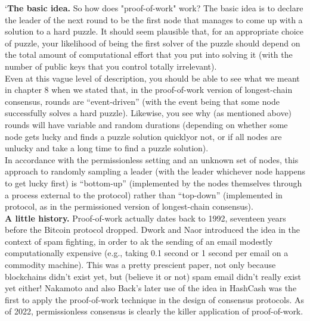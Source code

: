 `\textbf{The basic idea.} So how does "proof-of-work" work? The basic idea is to declare the
leader of the next round to be the first node that manages to come up with a solution to a
hard puzzle. It should seem plausible that, for an appropriate choice of puzzle, your likelihood
of being the first solver of the puzzle should depend on the total amount of computational
effort that you put into solving it (with the number of public keys that you control totally
irrelevant).\\
Even at this vague level of description, you should be able to see what we meant in chapter 8 when we stated that, in the proof-of-work version of longest-chain consensus, rounds are
“event-driven” (with the event being that some node successfully solves a hard puzzle). Likewise, you see why (as mentioned above) rounds will have variable and random durations (depending on whether some node gets lucky and finds a puzzle solution quicklyor not, or if all
nodes are unlucky and take a long time to find a puzzle solution).\\
In accordance with the permissionless setting and an unknown set of nodes, this approach
to randomly sampling a leader (with the leader whichever node happens to get lucky first)
is “bottom-up” (implemented by the nodes themselves through a process external to the
protocol) rather than “top-down” (implemented in protocol, as in the permissioned version
of longest-chain consensus).\\

\noindent
\textbf{A little history.} Proof-of-work actually dates back to 1992, seventeen years before the
Bitcoin protocol dropped. Dwork and Naor introduced the idea in the context of spam fighting, in order to ak the sending of an email modestly computationally expensive
(e.g., taking 0.1 second or 1 second per email on a commodity machine). This was a pretty
prescient paper, not only because blockchains didn’t exist yet, but (believe it or not) spam
email didn’t really exist yet either! Nakamoto and also Back’s later use
of the idea in HashCash was the first to apply the proof-of-work technique in the design
of consensus protocols. As of 2022, permissionless consensus is clearly the killer application
of proof-of-work.\\

